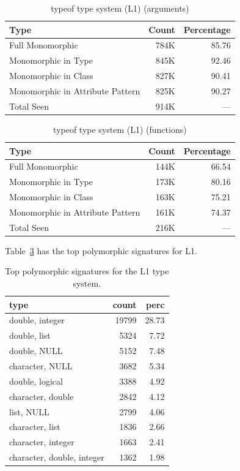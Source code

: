 \documentclass[acmsmall,10pt,review,anonymous]{acmart}\settopmatter{printfolios=true,printccs=false,printacmref=false}
\begin{document}
\begin{table}[ht]
\label{fig:L1argcounts}
\centering
\begin{tabular}{lrr}
  \hline
Type & Count & Percentage \\ 
  \hline
Full Monomorphic & 784K & 85.76 \\ 
  Monomorphic in Type & 845K & 92.46 \\ 
  Monomorphic in Class & 827K & 90.41 \\ 
  Monomorphic in Attribute Pattern & 825K & 90.27 \\ 
  Total Seen & 914K & --- \\ 
   \hline
\end{tabular}
\caption{typeof type system (L1) (arguments)}
\end{table}
\begin{table}[ht]
\label{fig:L1funcounts}
\centering
\begin{tabular}{lrr}
  \hline
Type & Count & Percentage \\ 
  \hline
Full Monomorphic & 144K & 66.54 \\ 
  Monomorphic in Type & 173K & 80.16 \\ 
  Monomorphic in Class & 163K & 75.21 \\ 
  Monomorphic in Attribute Pattern & 161K & 74.37 \\ 
  Total Seen & 216K & --- \\ 
   \hline
\end{tabular}
\caption{typeof type system (L1) (functions)}
\end{table}

Table~\ref{tab:L1toppoly} has the top polymorphic signatures for L1.

\begin{table}[ht]
\label{tab:L1toppoly}
\centering
\begin{tabular}{lrr}
  \hline
type & count & perc \\ 
  \hline
double, integer & 19799 & 28.73 \\ 
  double, list & 5324 & 7.72 \\ 
  double, NULL & 5152 & 7.48 \\ 
  character, NULL & 3682 & 5.34 \\ 
  double, logical & 3388 & 4.92 \\ 
  character, double & 2842 & 4.12 \\ 
  list, NULL & 2799 & 4.06 \\ 
  character, list & 1836 & 2.66 \\ 
  character, integer & 1663 & 2.41 \\ 
  character, double, integer & 1362 & 1.98 \\ 
   \hline
\end{tabular}
\caption{Top polymorphic signatures for the L1 type system.}
\end{table}
\end{document}

